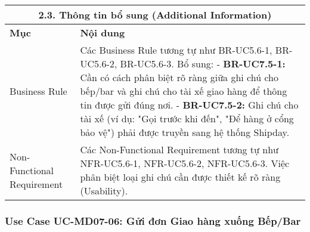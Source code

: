 \begin{longtable}{|m{4cm}|p{11cm}|}
\hline
\multicolumn{2}{|c|}{\textbf{2.3. Thông tin bổ sung (Additional Information)}} \\
\hline
\textbf{Mục} & \textbf{Nội dung} \\
\hline
Business Rule & Các Business Rule tương tự như BR-UC5.6-1, BR-UC5.6-2, BR-UC5.6-3. Bổ sung: \newline - \textbf{BR-UC7.5-1:} Cần có cách phân biệt rõ ràng giữa ghi chú cho bếp/bar và ghi chú cho tài xế giao hàng để thông tin được gửi đúng nơi. \newline - \textbf{BR-UC7.5-2:} Ghi chú cho tài xế (ví dụ: "Gọi trước khi đến", "Để hàng ở cổng bảo vệ") phải được truyền sang hệ thống Shipday. \\
\hline
Non-Functional Requirement & Các Non-Functional Requirement tương tự như NFR-UC5.6-1, NFR-UC5.6-2, NFR-UC5.6-3. Việc phân biệt loại ghi chú cần được thiết kế rõ ràng (Usability). \\
\hline
\end{longtable}

\subsubsection{Use Case UC-MD07-06: Gửi đơn Giao hàng xuống Bếp/Bar}

